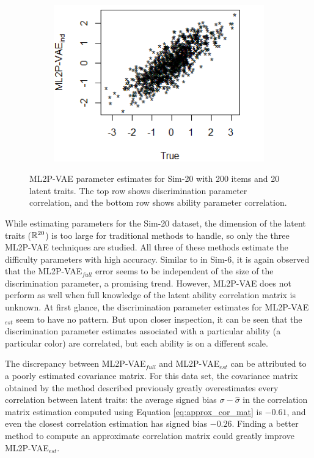 \begin{figure}[h]
\begin{subfigure}{.32\textwidth}
    \end{subfigure}
    \begin{subfigure}{.32\textwidth}
      \centering
      \includegraphics[width=.9\linewidth]{img/ml_journal_results/20skills/vae_ind_theta_20skills.png}
    \end{subfigure}
    \caption{ML2P-VAE parameter estimates for Sim-20 with 200 items and 20 latent traits. The top row shows discrimination parameter correlation, and the bottom row shows ability parameter correlation.}
    \label{fig:20skill_cor}
\end{figure}

While estimating parameters for the Sim-20 dataset, the dimension of the latent traits ($\mathbb{R}^{20}$) is too large for traditional methods to handle, so only the three ML2P-VAE techniques are studied. All three of these methods estimate the difficulty parameters with high accuracy. Similar to in Sim-6, it is again observed that the ML2P-VAE$_{full}$ error seems to be independent of the size of the discrimination parameter, a promising trend. However, ML2P-VAE does not perform as well when full knowledge of the latent ability correlation matrix is unknown. At first glance, the discrimination parameter estimates for ML2P-VAE$_{est}$ seem to have no pattern. But upon closer inspection, it can be seen that the discrimination parameter estimates associated with a particular ability (a particular color) are correlated, but each ability is on a different scale. 

The discrepancy between ML2P-VAE$_{full}$ and ML2P-VAE$_{est}$ can be attributed to a poorly estimated covariance matrix. For this data set, the covariance matrix obtained by the method described previously greatly overestimates every correlation between latent traits: the average signed bias $\sigma - \hat \sigma$ in the correlation matrix estimation computed using Equation \ref{eq:approx_cor_mat} is $-0.61$, and even the closest correlation estimation has signed bias $-0.26$. Finding a better method to compute an approximate correlation matrix could greatly improve ML2P-VAE$_{est}$.

